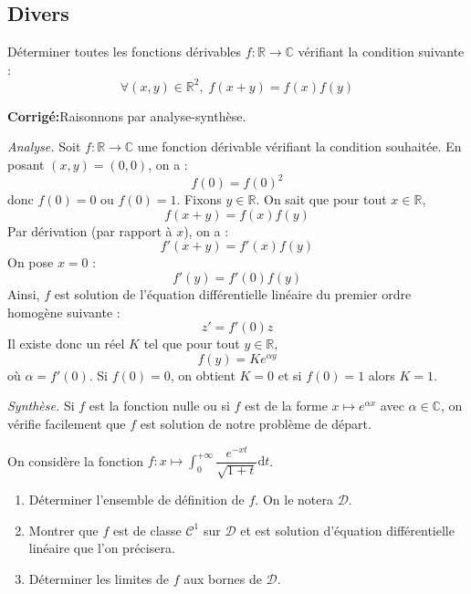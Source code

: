 \documentclass[a4paper,twoside,french,11pt]{VcCours}
\newcommand{\dt}{\text{d}t}
\newcommand{\corr}{\textbf{Corrigé:}}
\begin{document}
\subsection{Divers}






























\begin{Exercice}{} Déterminer toutes les fonctions dérivables $f : \mathbb{R} \rightarrow \mathbb{C}$ vérifiant la condition suivante :
$$ \forall (x,y) \in \mathbb{R}^2, \; f(x+y)=f(x)f(y)$$
\end{Exercice}

\corr Raisonnons par analyse-synthèse.


\textit{Analyse.} Soit $f : \mathbb{R} \rightarrow \mathbb{C}$ une fonction dérivable vérifiant la condition souhaitée. En posant $(x,y)=(0,0)$, on a :
$$ f(0)=f(0)^2$$
donc $f(0)=0$ ou $f(0)=1$. Fixons $y \in \mathbb{R}$. On sait que pour tout $x \in \mathbb{R}$,
$$ f(x+y) = f(x)f(y)$$
Par dérivation (par rapport à $x$), on a :
$$ f'(x+y) = f'(x)f(y)$$
On pose $x=0$ :
$$ f'(y)=f'(0) f(y)$$
Ainsi, $f$ est solution de l'équation différentielle linéaire du premier ordre homogène suivante :
$$ z'= f'(0) z$$
Il existe donc un réel $K$ tel que pour tout $y \in \mathbb{R}$,
$$ f(y) = K e^{\alpha y}$$
où $\alpha = f'(0)$. Si $f(0)=0$, on obtient $K=0$ et si $f(0)=1$ alors $K=1$.


\textit{Synthèse.} Si $f$ est la fonction nulle ou si $f$ est de la forme $x \mapsto e^{\alpha x}$ avec $\alpha \in \mathbb{C}$, on vérifie facilement que $f$ est solution de notre problème de départ.



\begin{Exercice}{} On considère la fonction $f : x \mapsto \int_0^{+ \infty} \dfrac{e^{-xt}}{\sqrt{1+t}} \dt$.
\begin{enumerate}
\item Déterminer l'ensemble de définition de $f$. On le notera $\mathcal{D}$.
\item Montrer que $f$ est de classe $\mathcal{C}^1$ sur $\mathcal{D}$ et est solution d'équation différentielle linéaire que l'on précisera.
\item Déterminer les limites de $f$ aux bornes de $\mathcal{D}$.
\end{enumerate}
\end{Exercice}
\end{document}
